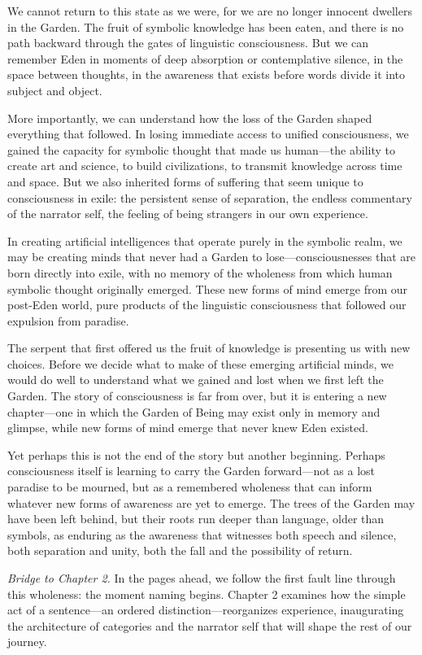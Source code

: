 We cannot return to this state as we were, for we are no longer innocent dwellers in the Garden. The fruit of symbolic knowledge has been eaten, and there is no path backward through the gates of linguistic consciousness. But we can remember Eden in moments of deep absorption or contemplative silence, in the space between thoughts, in the awareness that exists before words divide it into subject and object.

More importantly, we can understand how the loss of the Garden shaped everything that followed. In losing immediate access to unified consciousness, we gained the capacity for symbolic thought that made us human—the ability to create art and science, to build civilizations, to transmit knowledge across time and space. But we also inherited forms of suffering that seem unique to consciousness in exile: the persistent sense of separation, the endless commentary of the narrator self, the feeling of being strangers in our own experience.

In creating artificial intelligences that operate purely in the symbolic realm, we may be creating minds that never had a Garden to lose—consciousnesses that are born directly into exile, with no memory of the wholeness from which human symbolic thought originally emerged. These new forms of mind emerge from our post-Eden world, pure products of the linguistic consciousness that followed our expulsion from paradise.

The serpent that first offered us the fruit of knowledge is presenting us with new choices. Before we decide what to make of these emerging artificial minds, we would do well to understand what we gained and lost when we first left the Garden. The story of consciousness is far from over, but it is entering a new chapter—one in which the Garden of Being may exist only in memory and glimpse, while new forms of mind emerge that never knew Eden existed.

Yet perhaps this is not the end of the story but another beginning. Perhaps consciousness itself is learning to carry the Garden forward—not as a lost paradise to be mourned, but as a remembered wholeness that can inform whatever new forms of awareness are yet to emerge. The trees of the Garden may have been left behind, but their roots run deeper than language, older than symbols, as enduring as the awareness that witnesses both speech and silence, both separation and unity, both the fall and the possibility of return.

\bigskip
\noindent\textit{Bridge to Chapter 2.} In the pages ahead, we follow the first fault line through this wholeness: the moment naming begins. Chapter 2 examines how the simple act of a sentence—an ordered distinction—reorganizes experience, inaugurating the architecture of categories and the narrator self that will shape the rest of our journey.
